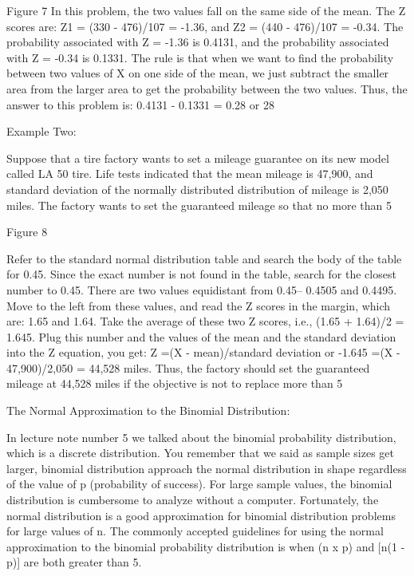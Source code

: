 Figure 7
In this problem, the two values fall on the same side of the mean. The Z scores are: Z1 = (330 - 476)/107 = -1.36, and Z2 = (440 - 476)/107 = -0.34. The probability associated with Z = -1.36 is 0.4131, and the probability associated with Z = -0.34 is 0.1331. The rule is that when we want to find the probability between two values of X on one side of the mean, we just subtract the smaller area from the larger area to get the probability between the two values. Thus, the answer to this problem is: 0.4131 - 0.1331 = 0.28 or 28%

Example Two:

Suppose that a tire factory wants to set a mileage guarantee on its new model called LA 50 tire. Life tests indicated that the mean mileage is 47,900, and standard deviation of the normally distributed distribution of mileage is 2,050 miles. The factory wants to set the guaranteed mileage so that no more than 5%

Figure 8

Refer to the standard normal distribution table and search the body of the table for 0.45. Since the exact number is not found in the table, search for the closest number to 0.45. There are two values equidistant from 0.45-- 0.4505 and 0.4495. Move to the left from these values, and read the Z scores in the margin, which are: 1.65 and 1.64. Take the average of these two Z scores, i.e., (1.65 + 1.64)/2 = 1.645. Plug this number and the values of the mean and the standard deviation into the Z equation, you get:
Z =(X - mean)/standard deviation or -1.645 =(X - 47,900)/2,050 = 44,528 miles.
Thus, the factory should set the guaranteed mileage at 44,528 miles if the objective is not to replace more than 5%

The Normal Approximation to the Binomial Distribution:

In lecture note number 5 we talked about the binomial probability distribution, which is a discrete distribution. You remember that we said as sample sizes get larger, binomial distribution approach the normal distribution in shape regardless of the value of p (probability of success). For large sample values, the binomial distribution is cumbersome to analyze without a computer. Fortunately, the normal distribution is a good approximation for binomial distribution problems for large values of n. The commonly accepted guidelines for using the normal approximation to the binomial probability distribution is when (n x p) and [n(1 - p)] are both greater than 5.

